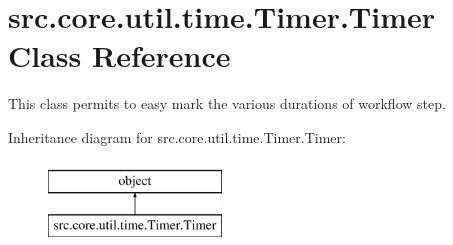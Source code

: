 \hypertarget{classsrc_1_1core_1_1util_1_1time_1_1Timer_1_1Timer}{\section{src.\-core.\-util.\-time.\-Timer.\-Timer Class Reference}
\label{classsrc_1_1core_1_1util_1_1time_1_1Timer_1_1Timer}
}


This class permits to easy mark the various durations of workflow step.  


Inheritance diagram for src.\-core.\-util.\-time.\-Timer.\-Timer\-:\begin{figure}[H]
\begin{center}
\leavevmode
\includegraphics[height=2.000000cm]{classsrc_1_1core_1_1util_1_1time_1_1Timer_1_1Timer}
\end{center}
\end{figure}
